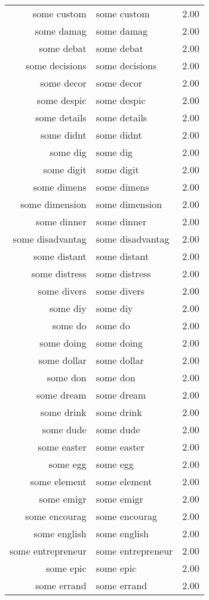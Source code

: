 \begin{table}[ht]
\begin{tabular}{rlr}
  some custom & some custom & 2.00 \\ 
  some damag & some damag & 2.00 \\ 
  some debat & some debat & 2.00 \\ 
  some decisions & some decisions & 2.00 \\ 
  some decor & some decor & 2.00 \\ 
  some despic & some despic & 2.00 \\ 
  some details & some details & 2.00 \\ 
  some didnt & some didnt & 2.00 \\ 
  some dig & some dig & 2.00 \\ 
  some digit & some digit & 2.00 \\ 
  some dimens & some dimens & 2.00 \\ 
  some dimension & some dimension & 2.00 \\ 
  some dinner & some dinner & 2.00 \\ 
  some disadvantag & some disadvantag & 2.00 \\ 
  some distant & some distant & 2.00 \\ 
  some distress & some distress & 2.00 \\ 
  some divers & some divers & 2.00 \\ 
  some diy & some diy & 2.00 \\ 
  some do & some do & 2.00 \\ 
  some doing & some doing & 2.00 \\ 
  some dollar & some dollar & 2.00 \\ 
  some don & some don & 2.00 \\ 
  some dream & some dream & 2.00 \\ 
  some drink & some drink & 2.00 \\ 
  some dude & some dude & 2.00 \\ 
  some easter & some easter & 2.00 \\ 
  some egg & some egg & 2.00 \\ 
  some element & some element & 2.00 \\ 
  some emigr & some emigr & 2.00 \\ 
  some encourag & some encourag & 2.00 \\ 
  some english & some english & 2.00 \\ 
  some entrepreneur & some entrepreneur & 2.00 \\ 
  some epic & some epic & 2.00 \\ 
  some errand & some errand & 2.00 \\ 

\end{tabular}
\end{table}
